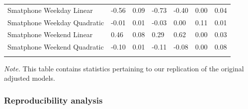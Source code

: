 \documentclass[floatsintext,man]{apa6}
\theoremstyle{definition}
\theoremstyle{definition}
\theoremstyle{definition}
\theoremstyle{remark}
\begin{document}
\begin{table}[tbp]
\begin{center}
\begin{threeparttable}
{\begin{tabular}{lllllll}
Smatphone Weekday Linear & -0.56 & 0.09 & -0.73 & -0.40 & 0.00 & 0.04\\
Smatphone Weekday Quadratic & -0.01 & 0.01 & -0.03 & 0.00 & 0.11 & 0.01\\
Smatphone Weekend Linear & 0.46 & 0.08 & 0.29 & 0.62 & 0.00 & 0.03\\
Smatphone Weekend Quadratic & -0.10 & 0.01 & -0.11 & -0.08 & 0.00 & 0.08\\
\bottomrule
\addlinespace
\end{tabular}
}
\begin{tablenotes}[para]
\textit{Note.} This table contains statistics pertaining to our replication of the original adjusted models.
\end{tablenotes}
\end{threeparttable}
\end{center}
\end{table}

\hypertarget{reproducibility-analysis}{%
\subsubsection{Reproducibility
analysis}\label{reproducibility-analysis}}
\end{document}
